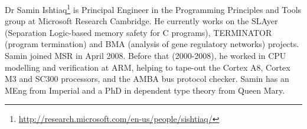 \documentclass[a4paper,11pt]{article}
\begin{document}
Dr Samin
Ishtiaq\footnote{\url{http://research.microsoft.com/en-us/people/sishtiaq/}}
is Principal Engineer in the Programming Principles and Tools group at
Microsoft Research Cambridge. He currently works on the SLAyer
(Separation Logic-based memory safety for C programs), TERMINATOR
(program termination) and BMA (analysis of gene regulatory networks)
projects. Samin joined MSR in April 2008. Before that (2000-2008), he
worked in CPU modelling and verification at ARM, helping to tape-out
the Cortex A8, Cortex M3 and SC300 processors, and the AMBA bus
protocol checker. Samin has an MEng from Imperial and a PhD in
dependent type theory from Queen Mary.



\end{document}
